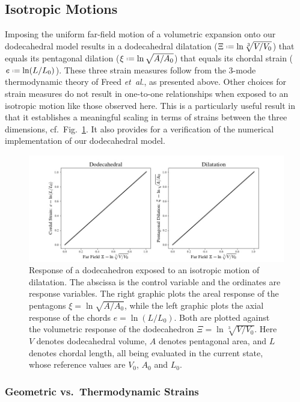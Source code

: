 \subsection{Isotropic Motions}

Imposing the uniform far-field motion of a volumetric expansion onto our dodecahedral model results in a dodecahedral dilatation ($\Xi \defeq \ln \sqrt[3]{ V \! / V_0 }$) that equals its pentagonal dilation ($\xi \defeq \ln \sqrt{ A / A_0 }$) that equals its chordal strain ($e \defeq \ln ( L / L_0 )$).  These three strain measures follow from the 3-mode thermo\-dynamic theory of Freed \textit{et~al}., \cite{Freedetal17,FreedZamani19} as presented above.  Other choices for strain measures do not result in one-to-one relationships when exposed to an isotropic motion like those observed here.  This is a particularly useful result in that it establishes a meaningful scaling in terms of strains between the three dimensions, cf.\ Fig.~\ref{figDilatation}.  It also provides for a verification of the numerical implementation of our dodecahedral model.  

\begin{figure}
	\centering
	\includegraphics[width=\textwidth]{figures/dilatation.jpg}
	\caption{Response of a dodecahedron exposed to an isotropic motion of dilatation.  The abscissa is the control variable and the ordinates are response variables. The right graphic plots the areal response of the pentagons $\xi = \ln \sqrt{A / A_0}$, while the left graphic plots the axial response of the chords $e = \ln ( L / L_0)$. Both are plotted against the volumetric response of the dodecahedron $\Xi = \ln \sqrt[3]{V \! / V_0}$.  Here $V$ denotes dodecahedral volume, $A$ denotes pentagonal area, and $L$ denotes chordal length, all being evaluated in the current state, whose reference values are $V_0$, $A_0$ and $L_0$.}
	\label{figDilatation}
\end{figure}

\subsubsection{Geometric vs.\ Thermodynamic Strains}

